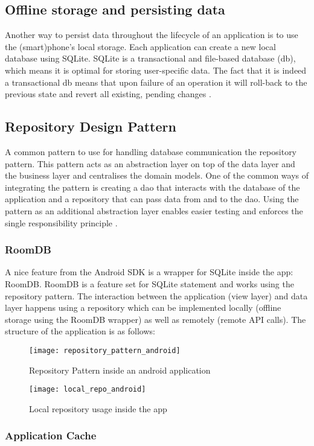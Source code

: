 \subsection{Offline storage and persisting data}
Another way to persist data throughout the lifecycle of an application is to use the (smart)phone's local storage. Each application can create a new local database using SQLite. SQLite is a transactional and file-based database (db), which means it is optimal for storing user-specific data. The fact that it is indeed a transactional db means that upon failure of an operation it will roll-back to the previous state and revert all existing, pending changes \cite{TutorialsPoint2019}.
\subsection{Repository Design Pattern}
A common pattern to use for handling database communication the repository pattern. This pattern acts as an abstraction layer on top of the data layer and the business layer and centralises the domain models. One of the common ways of integrating the pattern is creating a \acrfull{dao} that interacts with the database of the application and a repository that can pass data from and to the \acrshort{dao}. Using the pattern as an additional abstraction layer enables easier testing and enforces the single responsibility principle \cite{Per-ErikBergman2017} \cite{NahidulHasan2018}.
\subsubsection{RoomDB}
A nice feature from the Android SDK is a wrapper for SQLite inside the app: RoomDB. RoomDB is a feature set for SQLite statement and works using the repository pattern. The interaction between the application (view layer) and data layer happens using a repository which can be implemented locally (offline storage using the RoomDB wrapper) as well as remotely (remote API calls). The structure of the application is as follows:
\begin{figure}[h!]
\texttt{[image: repository\_pattern\_android]}
\centering
\caption{Repository Pattern inside an android application~\cite{EslamHussein2018}}
\end{figure}
\begin{figure}[h!]
\texttt{[image: local\_repo\_android]}
\centering
\caption{Local repository usage inside the app~\cite{Unknown2018}}
\end{figure}
\subsubsection{Application Cache}
